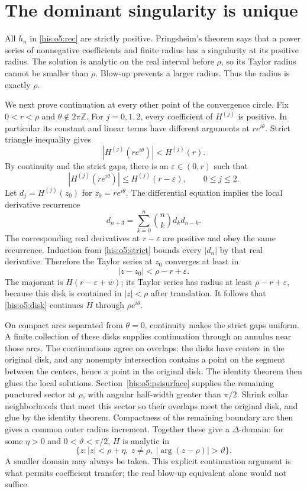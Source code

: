 \documentclass[11pt]{article}
\theoremstyle{remark}\newtheorem{remark}[theorem]{Remark}
\newcommand{\eps}{\varepsilon}
\numberwithin{equation}{section}
\begin{document}
\section{The dominant singularity is unique}\label{his:o5:dominant}
All $h_n$ in \eqref{his:o5:rec} are strictly positive. Pringsheim's theorem says
that a power series of nonnegative coefficients and finite radius has a
singularity at its positive radius. The solution is analytic on the real
interval before $\rho$, so its Taylor radius cannot be smaller than $\rho$.
Blow-up prevents a larger radius. Thus the radius is exactly $\rho$.

We next prove continuation at every other point of the convergence circle.
Fix $0<r<\rho$ and $\theta\notin2\pi\mathbb Z$. For $j=0,1,2$, every
coefficient of $H^{(j)}$ is positive. In particular its constant and linear
terms have different arguments at $re^{i\theta}$. Strict triangle
inequality gives
\[
|H^{(j)}(re^{i\theta})|<H^{(j)}(r).
\]
By continuity and the strict gaps, there is an $\eps\in(0,r)$ such that
\begin{equation}\label{his:o5:strict}
|H^{(j)}(re^{i\theta})|\le H^{(j)}(r-\eps),\qquad 0\le j\le2.
\end{equation}
Let $d_j=H^{(j)}(z_0)$ for $z_0=re^{i\theta}$. The differential equation
implies the local derivative recurrence
\[
d_{n+3}=\sum_{k=0}^{n}\binom nk d_kd_{n-k}.
\]
The corresponding real derivatives at $r-\eps$ are positive and obey the
same recurrence. Induction from \eqref{his:o5:strict} bounds every $|d_n|$ by that
real derivative. Therefore the Taylor series at $z_0$ converges at least
in
\begin{equation}\label{his:o5:disk}
|z-z_0|<\rho-r+\eps.
\end{equation}
The majorant is $H(r-\eps+w)$; its Taylor series has radius at least
$\rho-r+\eps$, because this disk is contained in $|z|<\rho$ after translation.
It follows that \eqref{his:o5:disk} continues $H$ through $\rho e^{i\theta}$.

On compact arcs separated from $\theta=0$, continuity makes the strict
gaps uniform. A finite collection of these disks supplies continuation
through an annulus near those arcs. The continuations agree on overlaps:
the disks have centers in the original disk, and any nonempty intersection
contains a point on the segment between the centers, hence a point in the
original disk. The identity theorem then glues the local solutions. Section~\ref{his:o5:psisurface} supplies the
remaining punctured sector at $\rho$, with angular half-width greater
than $\pi/2$. Shrink collar neighborhoods that meet this sector so their
overlaps meet the original disk, and glue by the identity theorem.
Compactness of the remaining boundary arc then gives a common outer
radius increment. Together these give a
$\Delta$-domain: for some $\eta>0$ and $0<\vartheta<\pi/2$, $H$ is analytic in
\begin{equation}\label{his:o5:delta}
\{z:|z|<\rho+\eta,\ z\ne\rho,
\ |\arg(z-\rho)|>\vartheta\}.
\end{equation}
A smaller domain may always be taken. This explicit continuation argument
is what permits coefficient transfer; the real blow-up equivalent alone
would not suffice.
\end{document}
